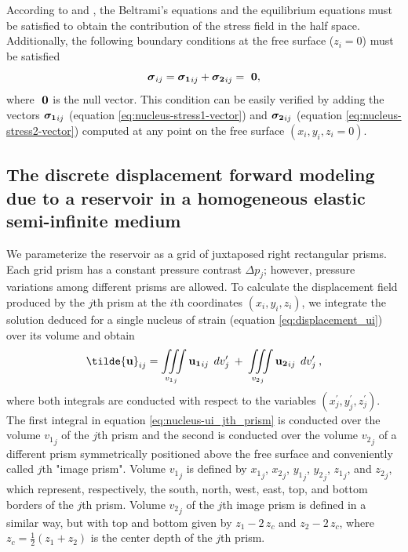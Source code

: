\documentclass[journal abbreviation, manuscript]{copernicus}
\begin{document}
According to \cite{Sharma56} and \cite{Tempone10}, the Beltrami’s equations \citep{Beltrami} and the equilibrium equations must be satisfied to obtain the contribution of the stress field in the half space. 
Additionally, the following boundary conditions at the free surface ($z_i = 0$) 
must be satisfied
\begin{equation}
\mbox{\boldmath$\sigma$}_{ij} = \mbox{\boldmath$\sigma_{1}$}_{ij} + 
\mbox{\boldmath$\sigma_{2}$}_{ij} = \mbox{ \boldmath$0$},
\label{eq:null_stress}
\end{equation}
where $\mbox{ \boldmath$0$}$ is the null vector.
This condition can be easily verified by adding the vectors 
$\mbox{\boldmath$\sigma_{1}$}_{ij}$ (equation \ref{eq:nucleus-stress1-vector}) and 
$\mbox{\boldmath$\sigma_{2}$}_{ij}$ (equation \ref{eq:nucleus-stress2-vector}) 
computed at any point on the free surface $(x_i, y_i, z_i = 0)$.


\subsection{The discrete displacement forward modeling due to a reservoir in a homogeneous elastic semi-infinite medium} \label{u-model}


We parameterize the reservoir as a grid of juxtaposed right rectangular prisms.
Each grid prism has a constant pressure contrast $\Delta p_{j}$; however, pressure variations among different prisms are allowed. 
To calculate the displacement field produced by the $j$th prism
at the $i$th coordinates  $(x_i, y_i, z_i)$, we integrate the solution deduced for a single nucleus of strain (equation \ref{eq:displacement_ui})
over its volume and obtain
\begin{equation}
{\bf{\tilde{u}}}_{ij} = 
\iiint\limits_{{v_{1}}_{j}}
{\bf{u_{1}}}_{ij} \: \:  dv_{j}^{\prime}
\: + \:
\iiint\limits_{{v_{2}}_{j}}
{\bf{u_{2}}}_{ij} \:\:  dv_{j}^{\prime} \: ,
\label{eq:nucleus-ui_jth_prism}
\end{equation}
where both integrals are conducted with respect to the variables 
$(x^{\prime}_{j}, y^{\prime}_{j}, z^{\prime}_{j})$. The first integral in equation 
\ref{eq:nucleus-ui_jth_prism} is conducted over the volume ${v_{1}}_{j}$ of the $j$th
prism and the second is conducted over the volume 
${v_{2}}_{j}$ of a different prism symmetrically positioned above the free surface 
and conveniently called $j$th "image prism".
Volume ${v_{1}}_{j}$ is defined by ${x_1}_{j}$, ${x_2}_{j}$, ${y_1}_{j}$, ${y_2}_{j}$,
${z_1}_{j}$, and ${z_2}_{j}$, which represent, respectively, the south, north, west, 
east, top, and bottom borders of the $j$th prism.
Volume ${v_{2}}_{j}$ of the $j$th image prism is defined in a similar way, but with 
top and bottom given by $z_1 - 2 \, z_c$ and $z_2 - 2 \, z_c$, where 
$z_c = \frac{1}{2}(z_1 + z_2)$ is the center depth of the $j$th prism.
\end{document}
